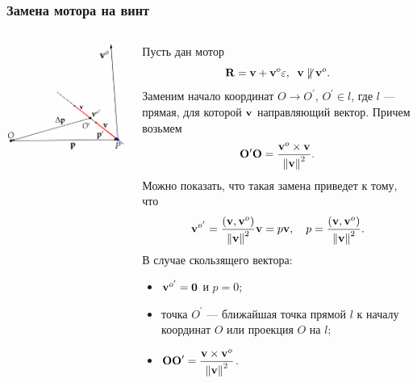 \begin{frame}
  \frametitle{Замена мотора на винт}
  \begin{columns}
    \begin{column}{0.35\textwidth}
      \begin{center}
        \includegraphics{img/screws/moment04}
      \end{center}
    \end{column}
    \begin{column}{0.65\textwidth}
      Пусть дан мотор
      \begin{equation*}
        \vb{R} = \vb{v} + \vb{v}^{o}\varepsilon, \;\; \vb{v} \not \parallel \vb{v}^{o}.
      \end{equation*}
      Заменим начало координат $O \to O^{\prime}$, $O^\prime \in l$, где $l$ — прямая, для которой $\vb{v}$ направляющий вектор. Причем возьмем
      \begin{equation*}
        \vb{O^{\prime}O} = 
        \dfrac{\vb{v}^{o}\times \vb{v}}{\norm{\vb{v}}^2}.
      \end{equation*}
      Можно показать, что такая замена приведет к тому, что
      \begin{equation*}
        \vb{v}^{o^{\prime}} = \dfrac{(\vb{v}, \vb{v}^{o})}{\norm{\vb{v}}^2}\vb{v} = p\vb{v},
        \quad
        p = \dfrac{(\vb{v}, \vb{v}^o)}{\norm{\vb{v}}^2}.
      \end{equation*}
      В случае скользящего вектора:
      \begin{itemize}
        \item $\vb{v}^{o^{\prime}} = \vb{0}$ и $p = 0$;
        \item точка $O^\prime$ — ближайшая точка прямой $l$ к началу координат $O$ или проекция $O$ на $l$;
        \item $\vb{OO}^{\prime} = \dfrac{\vb{v} \times \vb{v}^o}{\norm{\vb{v}}^2}$.
      \end{itemize}
    \end{column}
  \end{columns}
\end{frame}

